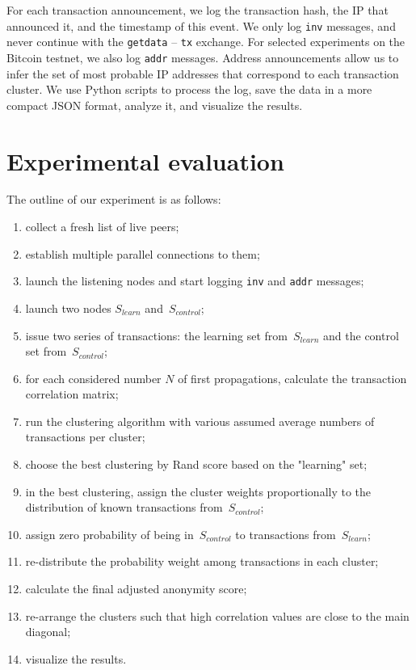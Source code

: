 For each transaction announcement, we log the transaction hash, the IP that announced it, and the timestamp of this event.
We only log \texttt{inv} messages, and never continue with the \texttt{getdata} -- \texttt{tx} exchange.
For selected experiments on the Bitcoin testnet, we also log \texttt{addr} messages.
Address announcements allow us to infer the set of most probable IP addresses that correspond to each transaction cluster.
We use Python scripts to process the log, save the data in a more compact JSON format, analyze it, and visualize the results.


\section{Experimental evaluation}

The outline of our experiment is as follows:

\begin{enumerate}
	\item collect a fresh list of live peers;
	\item establish multiple parallel connections to them;
	\item launch the listening nodes and start logging \texttt{inv} and \texttt{addr} messages;
	\item launch two nodes $S_{learn}$ and~$S_{control}$;%
	\item issue two series of transactions: the learning set from~$S_{learn}$ and the control set from~$S_{control}$;
	\item for each considered number $N$ of first propagations, calculate the transaction correlation matrix;
	\item run the clustering algorithm with various assumed average numbers of transactions per cluster;
	\item choose the best clustering by Rand score based on the "learning" set;
	\item in the best clustering, assign the cluster weights proportionally to the distribution of known transactions from~$S_{control}$;
	\item assign zero probability of being in~$S_{control}$ to transactions from~$S_{learn}$;
	\item re-distribute the probability weight among transactions in each cluster;
	\item calculate the final adjusted anonymity score;
	\item re-arrange the clusters such that high correlation values are close to the main diagonal;
	\item visualize the results.
\end{enumerate}

